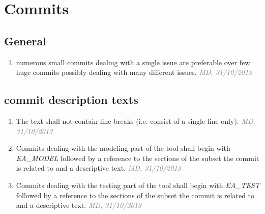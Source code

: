 \documentclass[a4paper, oneside]{scrreprt}
\let\emph\textsl
\newcommand{\ruleauthor}[2]{\mbox{}\newline\mbox{}\hfill{\footnotesize\textcolor{gray}{\emph{#1, #2}}}\xspace}
\begin{document}
\section{Commits}
\subsection{General}
\begin{enumerate}
\item numerous small commits dealing with a single issue are preferable over few huge commits possibly dealing with many different issues. \ruleauthor{MD}{31/10/2013}
\end{enumerate}

\subsection{commit description texts}
\begin{enumerate}
\item The text shall not contain line-breaks (i.e. consist of a single line only). \ruleauthor{MD}{31/10/2013}
\item Commits dealing with the modeling part of the tool shall begin with \emph{EA_MODEL} followed by a reference to the sections of the subset the commit is related to and a descriptive text. \ruleauthor{MD}{31/10/2013}
\item Commits dealing with the testing part of the tool shall begin with \emph{EA_TEST} followed by a reference to the sections of the subset the commit is related to and a descriptive text. \ruleauthor{MD}{31/10/2013}
\end{enumerate}
\end{document}
